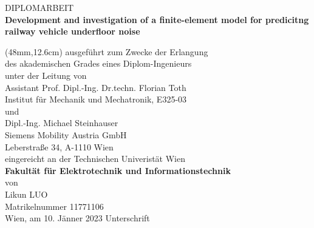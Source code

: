 \vspace{2.8cm}
\hspace{17mm}
\begin{minipage}{14cm} 
	{\LARGE DIPLOMARBEIT} \\[12mm]
	\doublespacing\textbf{\LARGE Development and investigation of a finite-element model for predicitng railway vehicle underfloor noise}
\end{minipage}

	{\fontsize{12}{1} \selectfont
\begin{textblock*}{14cm}(48mm,12.6cm)
	\noindent
	ausgeführt zum Zwecke der Erlangung \\[2.5mm]
	des akademischen Grades eines Diplom-Ingenieurs \\[2.5mm]
	unter der Leitung von \\[8mm]
	Assistant Prof. Dipl.-Ing. Dr.techn. Florian Toth \\[2.5mm]
	Institut für Mechanik und Mechatronik, E325-03 \\[8mm]
    und \\[8mm]
    Dipl.-Ing. Michael Steinhauser \\[2.5mm]
    Siemens Mobility Austria GmbH \\[2.5mm]
    Leberstraße 34, A-1110 Wien \\[8mm]
	eingereicht an der Technischen Univeristät Wien \\[2.5mm]
	\textbf{Fakultät für Elektrotechnik und Informationstechnik} \\[4mm]
	von \\[20mm]
	Likun LUO \\[2.5mm]
	Matrikelnummer 11771106 \\[2.5mm]
	Wien, am 10. Jänner 2023 \hspace{50mm} Unterschrift\\[25mm]
\end{textblock*}}